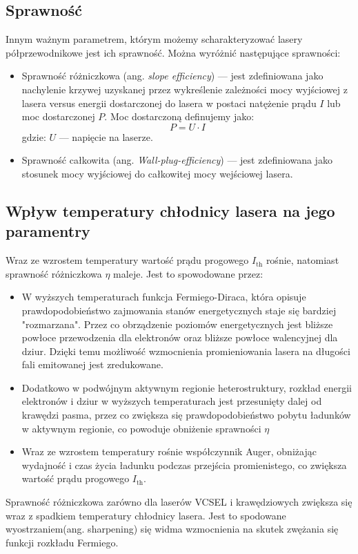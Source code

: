 \subsection{Sprawność}
Innym ważnym parametrem, którym możemy scharakteryzować lasery półprzewodnikowe jest ich sprawność. Można wyróżnić następujące sprawności:
\begin{itemize}
\item Sprawność różniczkowa (ang. \textit{slope efficiency}) --- jest zdefiniowana jako nachylenie krzywej uzyskanej przez wykreślenie zależności
mocy wyjściowej z lasera versus energii dostarczonej do lasera w postaci natężenie prądu $I$ lub moc dostarczonej $P$.
Moc dostarczoną definujemy jako:
\begin{equation}
P = U \cdot I
\end{equation}
gdzie: $U$ --- napięcie na laserze.
\item Sprawność całkowita (ang. \textit{Wall-plug-efficiency}) --- jest zdefiniowana jako stosunek mocy wyjściowej do całkowitej mocy wejściowej lasera.
\end{itemize}
\subsection{Wpływ temperatury chłodnicy lasera na jego paramentry}
Wraz ze wzrostem temperatury wartość prądu progowego $I_{\mathrm{th}}$ rośnie, natomiast sprawność różniczkowa $\eta$ maleje. Jest to spowodowane przez:
\begin{itemize}
\item W wyższych temperaturach funkcja Fermiego-Diraca, która opisuje prawdopodobieństwo zajmowania stanów energetycznych staje się bardziej "rozmarzana". Przez co obrządzenie poziomów energetycznych jest bliższe powłoce przewodzenia dla elektronów oraz bliższe powłoce walencyjnej dla dziur. Dzięki temu możliwość wzmocnienia promieniowania lasera na długości fali emitowanej jest zredukowane.
\item Dodatkowo w podwójnym aktywnym regionie heterostruktury, rozkład energii elektronów i dziur w wyższych temperaturach jest przesunięty dalej od krawędzi pasma, przez co zwiększa się prawdopodobieństwo pobytu ładunków w aktywnym regionie, co powoduje obniżenie sprawności $\eta$
\item Wraz ze wzrostem temperatury rośnie współczynnik Auger, obniżając wydajność i czas życia ładunku podczas przejścia promienistego, co zwiększa wartość prądu progowego $I_{\mathrm{th}}$.
\end{itemize}
Sprawność różniczkowa zarówno dla laserów VCSEL i krawędziowych zwiększa się wraz z spadkiem temperatury chłodnicy lasera.
Jest to spodowane wyostrzaniem(ang. sharpening) się widma wzmocnienia na skutek zwężania się funkcji rozkładu Fermiego.
